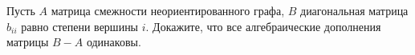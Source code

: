 Пусть $A$ матрица смежности неориентированного графа, $B$ диагональная матрица $b_{ii}$ равно степени
вершины $i$. Докажите, что все алгебраические дополнения матрицы $B - A$ одинаковы.
